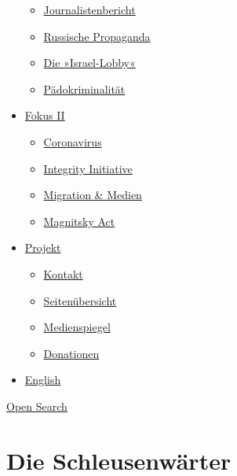 \begin{itemize}
  \begin{itemize}
  \tightlist
  \item
    \href{https://swprs.org/bericht-eines-journalisten/}{Journalistenbericht}
  \item
    \href{https://swprs.org/russische-propaganda/}{Russische Propaganda}
  \item
    \href{https://swprs.org/die-israel-lobby-fakten-und-mythen/}{Die
    »Israel-Lobby«}
  \item
    \href{https://swprs.org/geopolitik-und-paedokriminalitaet/}{Pädokriminalität}
  \end{itemize}
\item
  \href{https://swprs.org/migration-und-medien/}{Fokus II}

  \begin{itemize}
  \tightlist
  \item
    \href{https://swprs.org/covid-19-hinweis-ii/}{Coronavirus}
  \item
    \href{https://swprs.org/die-integrity-initiative/}{Integrity
    Initiative}
  \item
    \href{https://swprs.org/migration-und-medien/}{Migration \& Medien}
  \item
    \href{https://swprs.org/der-fall-magnitsky/}{Magnitsky Act}
  \end{itemize}
\item
  \href{https://swprs.org/kontakt/}{Projekt}

  \begin{itemize}
  \tightlist
  \item
    \href{https://swprs.org/kontakt/}{Kontakt}
  \item
    \href{https://swprs.org/uebersicht/}{Seitenübersicht}
  \item
    \href{https://swprs.org/medienspiegel/}{Medienspiegel}
  \item
    \href{https://swprs.org/donationen/}{Donationen}
  \end{itemize}
\item
  \href{https://swprs.org/contact/}{English}
\end{itemize}

\protect\hyperlink{}{Open Search}

\hypertarget{die-schleusenwuxe4rter}{%
\section{Die Schleusenwärter}\label{die-schleusenwuxe4rter}}

